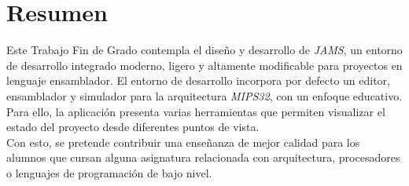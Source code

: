 \chapter{Resumen} \label{ch:resumen}

Este Trabajo  Fin de Grado contempla el diseño y desarrollo de \textit{JAMS},
un entorno de desarrollo integrado moderno, ligero y altamente modificable
para proyectos en lenguaje ensamblador.
El entorno de desarrollo incorpora por defecto un editor, ensamblador y simulador
para la arquitectura \textit{MIPS32}, con un enfoque educativo.
Para ello, la aplicación presenta varias herramientas que permiten
visualizar el estado del proyecto desde diferentes puntos de vista.\\
Con esto, se pretende contribuir  una enseñanza de mejor calidad para
los alumnos que cursan alguna asignatura relacionada con arquitectura,
procesadores o lenguajes de programación de bajo nivel.
